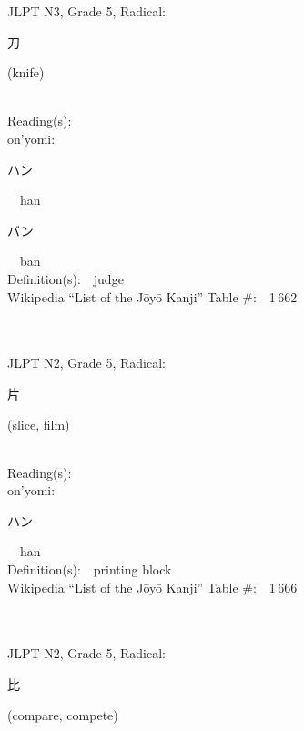 \begin{multicols}{2}
{JLPT N3, Grade 5, Radical:\ \ {\begin{CJK}{UTF8}{min} 刀 \end{CJK}} (knife) } \\
Reading(s):\ \ \\
{\hspace*{1em}}on'yomi:\ \ \\
{\hspace*{2em}}{\begin{CJK}{UTF8}{min} ハン \end{CJK}}\ \ han\ \ \\
{\hspace*{2em}}{\begin{CJK}{UTF8}{min} バン \end{CJK}}\ \ ban\ \ \\
Definition(s):\ \ judge \\
Wikipedia ``List of the J\=oy\=o Kanji'' Table \#:\ \ 1\,662 \\
\ \ \\
{\fontsize{34pt}{40pt}  }\ \ \\  %
{JLPT N2, Grade 5, Radical:\ \ {\begin{CJK}{UTF8}{min} 片 \end{CJK}} (slice, film) } \\
Reading(s):\ \ \\
{\hspace*{1em}}on'yomi:\ \ \\
{\hspace*{2em}}{\begin{CJK}{UTF8}{min} ハン \end{CJK}}\ \ han\ \ \\
Definition(s):\ \ printing block \\
Wikipedia ``List of the J\=oy\=o Kanji'' Table \#:\ \ 1\,666 \\
\ \ \\
{\fontsize{34pt}{40pt}  }\ \ \\  %
{JLPT N2, Grade 5, Radical:\ \ {\begin{CJK}{UTF8}{min} 比 \end{CJK}} (compare, compete) } \\

\end{multicols}
